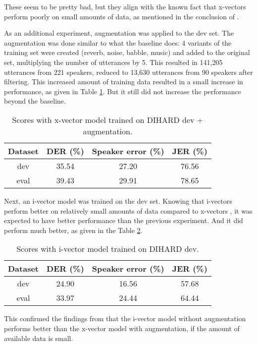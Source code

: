 		These seem to be pretty bad, but they align with the known fact that x-vectors perform poorly on small amounts of data, as mentioned in the conclusion of \cite{huang2018jhu}.
		
		As an additional experiment, augmentation was applied to the dev set. The augmentation was done similar to what the baseline does: 4 variants of the training set were created (reverb, noise, babble, music) and added to the original set, multiplying the number of utterances by 5. This resulted in 141,205 utterances from 221 speakers, reduced to 13,630 utterances from 90 speakers after filtering. This increased amount of training data resulted in a small increase in performance, as given in Table \ref{table-dev-xvec-aug}. But it still did not increase the performance beyond the baseline.
		
		\begin{table}[h]
			\centering
			\begin{tabular}{|c|c|c|c|}
				\hline
				Dataset & DER (\%) & Speaker error (\%) & JER (\%) \\
				\hline
				dev & 35.54 & 27.20 & 76.56 \\
				\hline
				eval & 39.43 & 29.91 & 78.65 \\
				\hline
			\end{tabular}
			\caption{Scores with x-vector model trained on DIHARD dev + augmentation.}
			\label{table-dev-xvec-aug}
		\end{table}
	
		Next, an i-vector model was trained on the dev set. Knowing that i-vectors perform better on relatively small amounts of data compared to x-vectors \cite{huang2018jhu}, it was expected to have better performance than the previous experiment. And it did perform much better, as given in the Table \ref{table-dev-ivec}.
		
		\begin{table}[h]
			\centering
			\begin{tabular}{|c|c|c|c|}
				\hline
				Dataset & DER (\%) & Speaker error (\%) & JER (\%) \\
				\hline
				dev & 24.90 & 16.56 & 57.68 \\
				\hline
				eval & 33.97 & 24.44 & 64.44 \\
				\hline
			\end{tabular}
			\caption{Scores with i-vector model trained on DIHARD dev.}
			\label{table-dev-ivec}
		\end{table}
		
		This confirmed the findings from \cite{huang2018jhu} that the i-vector model without augmentation performs better than the x-vector model with augmentation, if the amount of available data is small.
		
